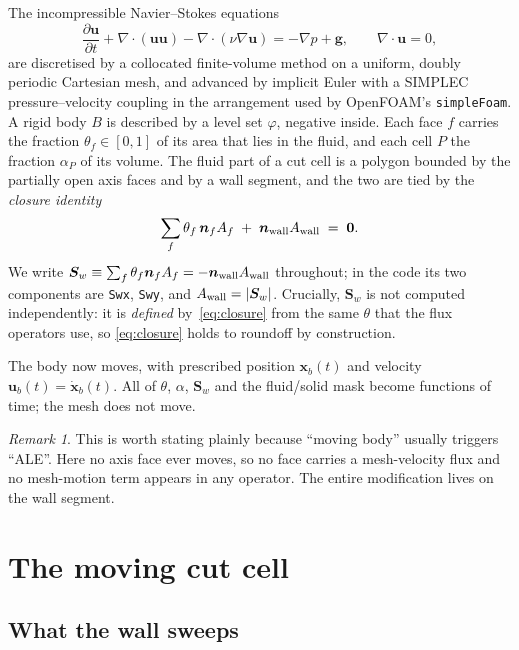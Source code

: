 \documentclass[11pt,a4paper]{article}
\theoremstyle{remark}
\newtheorem{remark}{Remark}
\newcommand{\uu}{\bm{u}}
\newcommand{\nn}{\bm{n}}
\newcommand{\Sw}{\bm{S}_w}
\newcommand{\ub}{\uu_b}
\begin{document}
The incompressible Navier--Stokes equations
\begin{equation}
\frac{\partial \uu}{\partial t}+\nabla\!\cdot\!(\uu\uu)-\nabla\!\cdot\!(\nu\nabla\uu)
=-\nabla p+\bm{g},
\qquad \nabla\!\cdot\!\uu=0,
\label{eq:ns}
\end{equation}
are discretised by a collocated finite-volume method on a uniform, doubly periodic Cartesian
mesh, and advanced by implicit Euler with a SIMPLEC pressure--velocity coupling in the
arrangement used by OpenFOAM's \texttt{simpleFoam}. A rigid body $B$ is described by a level set
$\varphi$, negative inside. Each face $f$ carries the fraction $\theta_f\in[0,1]$ of its area
that lies in the fluid, and each cell $P$ the fraction $\alpha_P$ of its volume. The fluid part
of a cut cell is a polygon bounded by the partially open axis faces and by a wall segment, and
the two are tied by the \emph{closure identity}
\begin{equation}
\sum_f \theta_f\,\nn_f A_f \;+\; \nn_{\rm wall}A_{\rm wall} \;=\; \bm{0}.
\label{eq:closure}
\end{equation}
We write $\Sw\equiv\sum_f\theta_f\nn_fA_f=-\nn_{\rm wall}A_{\rm wall}$ throughout; in the code
its two components are \texttt{Swx}, \texttt{Swy}, and $A_{\rm wall}=|\Sw|$. Crucially, $\Sw$ is
not computed independently: it is \emph{defined} by~\eqref{eq:closure} from the same $\theta$
that the flux operators use, so \eqref{eq:closure} holds to roundoff by construction.

The body now moves, with prescribed position $\bm{x}_b(t)$ and velocity
$\ub(t)=\dot{\bm{x}}_b(t)$. All of $\theta$, $\alpha$, $\Sw$ and the fluid/solid mask become
functions of time; the mesh does not move.

\begin{remark}
This is worth stating plainly because ``moving body'' usually triggers ``ALE''. Here no axis
face ever moves, so no face carries a mesh-velocity flux and no mesh-motion term appears in any
operator. The entire modification lives on the wall segment.
\end{remark}

\section{The moving cut cell}

\subsection{What the wall sweeps}
\end{document}
